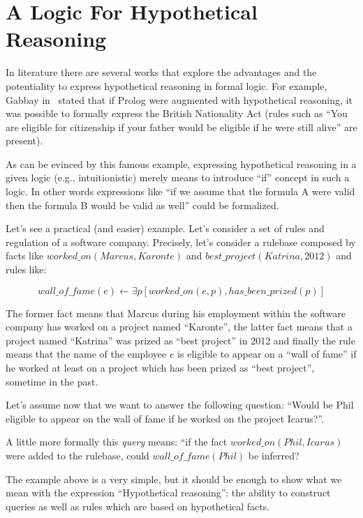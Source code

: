 \section{A Logic For Hypothetical Reasoning}
\label{sec:lfhr}
In literature there are several works that explore the advantages and the potentiality
to express hypothetical reasoning in formal logic.
For example, Gabbay in~\cite{Gabbay1984319} stated that if Prolog
were augmented with hypothetical reasoning,
it was possible to formally express the British
Nationality Act (rules such as
``You are eligible for citizenship if your father would be eligible if he were
still alive'' are present).

As can be evinced by this famous example, expressing hypothetical reasoning in a given logic
(e.g., intuitionistic) merely means to introduce ``if'' concept in such a logic.
In other words expressions like
``if we assume that the formula A were valid then the formula B would be valid as well'' could be
formalized.

Let's see a practical (and easier) example. Let's consider a set of rules and regulation of a
software company. Precisely, let's consider a rulebase composed by facts like
$worked\_on(Marcus, Karonte)$ and $best\_project(Katrina, 2012)$ and rules like:

\begin{equation}
  wall\_of\_fame(e) \leftarrow \exists p [worked\_on(e, p), has\_been\_prized(p)]
\end{equation}

The former fact means that Marcus during his employment within the software company has worked
on a project named ``Karonte'', the latter fact means that a project named ``Katrina'' was
prized as ``best project'' in 2012 and finally the rule means
that the name of the employee $e$ is eligible to appear on a ``wall of fame'' if
he worked at least on a project which has been prized as ``best project'',
sometime in the past.

Let's assume now that we want to answer the following question: ``Would
be Phil eligible to appear on the wall of fame if he worked on the project Icarus?''.

A little more formally this \textit{query} means: ``if the fact $worked\_on(Phil, Icarus)$ were
added to the rulebase, could $wall\_of\_fame(Phil)$ be inferred?

The example above is a very simple, but it should be enough to show what we mean
with the expression ``Hypothetical reasoning'': the ability to construct queries as well as
rules which are based on hypothetical facts.

